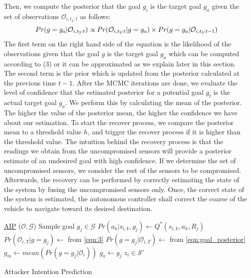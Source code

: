 \documentclass[conference]{IEEEtran}
\begin{document}
Then, we compute the posterior that the goal $g_i$ is the target goal $g_a$ given the set of observations $\mathcal{O}_{i,t_2:t}$ as follows:
\begin{equation} Pr(g=g_a|\mathcal{O}_{i,t_2:t}) \propto Pr(\mathcal{O}_{i,t_2:t} | g = g_a) \\ \times Pr(g=g_a|\mathcal{O}_{i,t_2:t-1})
\label{eqn:goal_posterior}
\end{equation}
The first term on the right hand side of the equation is the likelihood of the observations given that the goal $g$ is the target goal $g_a$ which can be computed according to (3) or it can be approximated as we explain later in this section. The second term is the prior which is updated from the posterior calculated at the previous time $t-1$.
After the MCMC iterations are done, we evaluate the level of confidence that the estimated posterior for a potential goal $g_t$ is the actual target goal $g_a$. We perform this by calculating the mean of the posterior. The higher the value of the posterior mean, the higher the confidence we have about our estimation.  To start the recover process, we compare the posterior mean to a threshold value $h$, and trigger the recover process if  it is higher than the threshold value. The intuition behind the recovery process is that the readings we obtain from the uncompromised sensors will provide a posterior estimate of an undesired goal with high confidence. If we determine the set of uncompromised sensors, we consider the rest of the sensors to be compromised. Afterwards, the recovery can be performed by correctly estimating the state of the system by fusing the uncompromised sensors only. Once, the correct state of the system is estimated, the autonomous controller shall correct the coarse of the vehicle to navigate toward its desired destination.
\begin{algorithm}
    \underline{AIP} ($\mathcal{O}, \mathcal{G}$)\;
    {
        {
            Sample goal $g_j \in \mathcal{G}$\;
            { 
                $Pr(a_k|s_{i,k},g_j) \leftarrow Q^*(s_{i,k},a_k,R_j)$\;
            }
            $Pr(\mathcal{O}_{i,T}|g=g_j) \leftarrow$  from \ref{eqn:3}\;
            $Pr(g=g_j|\mathcal{O}_{i,T}) \leftarrow$ from \ref{eqn:goal_posterior}\;
        }
        $g_m \leftarrow mean(Pr(g=g_j|\mathcal{O}_i))$\;
        {
            $g_a \leftarrow g_j$\;
            $z_i \in \mathcal{S}'$\;
        }
    }
    \caption{Attacker Intention Prediction}
\end{algorithm}
\end{document}
